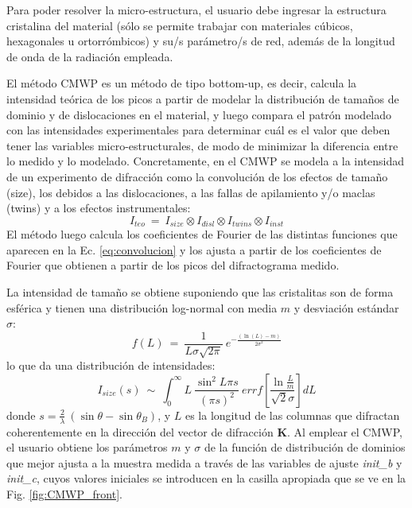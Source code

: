 Para poder resolver la micro-estructura, el usuario debe ingresar la estructura cristalina del material (sólo se permite trabajar con materiales cúbicos, hexagonales u ortorrómbicos) y su/s parámetro/s de red, además de la longitud de onda de la radiación empleada.

El método CMWP es un método de tipo bottom-up, es decir, calcula la intensidad teórica de los picos a partir de modelar la distribución de tamaños de dominio y de dislocaciones en el material, y luego compara el patrón modelado con las intensidades experimentales para determinar cuál es el valor que deben tener las variables micro-estructurales, de modo de minimizar la diferencia entre lo medido y lo modelado.
Concretamente, en el CMWP se modela a la intensidad de un experimento de difracción como la convolución de los efectos de tamaño (size), los debidos a las dislocaciones, a las fallas de apilamiento y/o maclas (twins) y a los efectos instrumentales:
\begin{equation}
  I_{teo} \ = \ I_{size} \otimes I_{disl} \otimes I_{twins} \otimes I_{inst}
  \label{eq:convolucion}
\end{equation}
\noindent
El método luego calcula los coeficientes de Fourier de las distintas funciones que aparecen en la Ec. \ref{eq:convolucion} y los ajusta a partir de los coeficientes de Fourier que obtienen a partir de los picos del difractograma medido.

La intensidad de tamaño se obtiene suponiendo que las cristalitas son de forma esférica y tienen una distribución log-normal con media $m$ y desviación estándar $\sigma$:
\begin{equation}
  f(L) \ = \ \frac{1}{L \sigma \sqrt{2 \pi}} \ e^{-\frac{(\ln(L)-m)}{2 \sigma^2}}
  \label{eq:lognormal}
\end{equation}
\noindent
lo que da una distribución de intensidades\cite{Ribarik2008}:
\begin{equation}
  I_{size}(s) \ \sim \ \int_0^{\infty} L \ \frac{\sin^2{L \pi s}}{(\pi s)^2} \ errf \left[ \frac{\ln{\frac{L}{m}}}{\sqrt{2}\sigma} \right] dL
  \label{eq:Isize}
\end{equation}
\noindent
donde $s = \frac{2}{\lambda} \ (\sin \theta - \sin \theta_B)$, y $L$ es la longitud de las columnas que difractan coherentemente en la dirección del vector de difracción $\mathbf{K}$.
Al emplear el CMWP, el usuario obtiene los parámetros $m$ y $\sigma$ de la función de distribución de dominios que mejor ajusta a la muestra medida a través de las variables de ajuste \textit{init\_b} y \textit{init\_c}, cuyos valores iniciales se introducen en la casilla apropiada que se ve en la Fig. \ref{fig:CMWP_front}.

